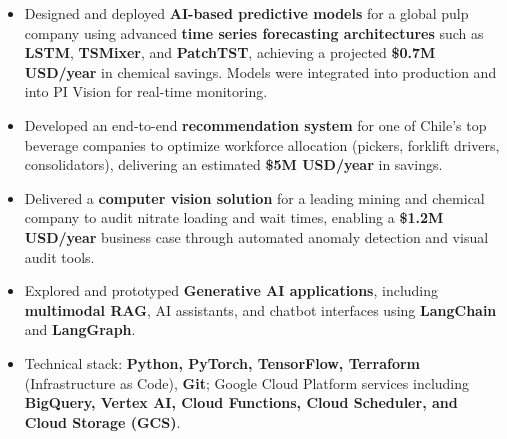 \documentclass[9pt,a4paper,ragged2e]{altacv}
\begin{document}


\begin{fullwidth}
\makecvheader
\end{fullwidth}


\begin{itemize}
\item Designed and deployed \textbf{AI-based predictive models} for a global pulp company using advanced \textbf{time series forecasting architectures} such as \textbf{LSTM}, \textbf{TSMixer}, and \textbf{PatchTST}, achieving a projected \textbf{\$0.7M USD/year} in chemical savings. Models were integrated into production and into PI Vision for real-time monitoring.

\item Developed an end-to-end \textbf{recommendation system} for one of Chile’s top beverage companies to optimize workforce allocation (pickers, forklift drivers, consolidators), delivering an estimated \textbf{\$5M USD/year} in savings.

\item Delivered a \textbf{computer vision solution} for a leading mining and chemical company to audit nitrate loading and wait times, enabling a \textbf{\$1.2M USD/year} business case through automated anomaly detection and visual audit tools.

\item Explored and prototyped \textbf{Generative AI applications}, including \textbf{multimodal RAG}, AI assistants, and chatbot interfaces using \textbf{LangChain} and \textbf{LangGraph}.

\item Technical stack: \textbf{Python, PyTorch, TensorFlow, Terraform} (Infrastructure as Code), \textbf{Git}; Google Cloud Platform services including \textbf{BigQuery, Vertex AI, Cloud Functions, Cloud Scheduler, and Cloud Storage (GCS)}.
\end{itemize}
\end{document}
